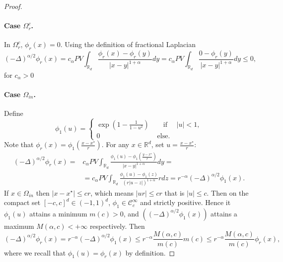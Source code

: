 \documentclass[11pt,handout]{article}%
\numberwithin{equation}{section}
\theoremstyle{definition}
\def\RR{\mathbb R}
\begin{document}
\begin{proof}
	\paragraph{Case $\Omega_r^c$.} In $\Omega_r^c$, $\phi_r(x)=0$. Using the definition of fractional Laplacian 
	\begin{equation*}
		(-\Delta)^{\alpha/2} \phi_r(x) = c_\alpha PV \int_{\RR_d} \frac{\phi_r(x)-\phi_r(y)}{\vert x-y\vert^{1+\alpha}} dy = c_\alpha PV \int_{\RR_d} \frac{0-\phi_r(y)}{\vert x-y\vert^{1+\alpha}} dy \leq 0,
	\end{equation*}
	for $c_\alpha>0$
	\paragraph{Case $\Omega_{in}$.} 
	Define 
	\begin{equation}\label{eq:phi_1} 
		\phi_1(u) =   \begin{cases}
			\exp \left( 1- \frac{1}{1 - u^2} \right)  \qquad \text{if } \quad \vert u \vert < 1,\\
			0  \qquad  \qquad \qquad \qquad  ~ \text{else}. 
		\end{cases}  
	\end{equation}
	Note that $\phi_r(x) = \phi_1\left( \frac{x-x^\star}{r}\right)$. For any $x\in \RR^d$, set $u=\frac{x-x^\star}{r} $:
	\begin{equation}\label{eq:relation_phi1_phi_r} 
		\begin{split}
			(-\Delta)^{\alpha/2} \phi_r(x) =&   c_\alpha PV \int_{\RR_d} \frac{\phi_1(u)-\phi_1(\frac{y-x^\star}{r})}{\vert x-y\vert^{1+\alpha}} dy = \\ & = c_\alpha PV \int_{\RR_d} \frac{\phi_1(u)-\phi_1(z)}{(r\vert u-z\vert)^{1+\alpha}} r dz  = r^{-\alpha}  (-\Delta)^{\alpha/2} \phi_1(x).
		\end{split}
	\end{equation}
	If $x\in \Omega_{in}$ then $\vert x-x^\star\vert\leq cr$, which means $\vert ur\vert \leq cr$ that is $\vert u \vert \leq c$. Then on the compact set $[-c,c]^d \in (-1,1)^d$, $\phi_1\in \mathcal{C}_c^\infty$ and strictly positive. Hence it $\phi_1(u)$ attains a minimum $m(c)>0$, and $((-\Delta)^{\alpha/2}\phi_1(x))$  attains a maximum $M(\alpha,c)<+\infty$  respectively. 
	Then 
	\begin{equation}
		(-\Delta)^{\alpha/2} \phi_r(x) =  r^{-\alpha}  (-\Delta)^{\alpha/2} \phi_1(x) \leq  r^{-\alpha} \frac{M(\alpha,c)}{m(c)} m(c) \leq   r^{-\alpha} \frac{M(\alpha,c)}{m(c)}\phi_r(x), 
	\end{equation}
	where we recall that $\phi_1(u) = \phi_r(x)$ by definition.  

\end{proof}
\end{document}
